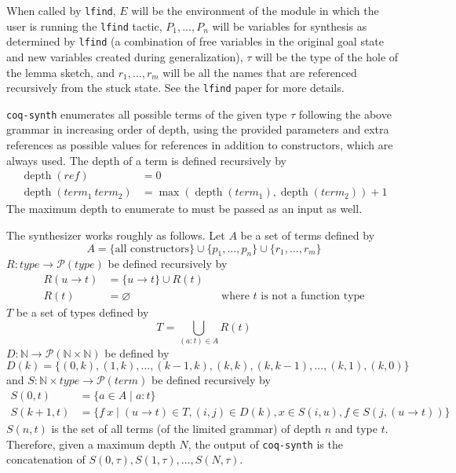 \documentclass[11pt]{article}
\newcommand{\N}{\mathbb{N}}
\DeclareMathOperator{\depth}{depth}
\begin{document}
When called by \texttt{lfind}, $E$ will be the environment of the module in which the user is running the \texttt{lfind} tactic, $P_1, \dots, P_n$ will be variables for synthesis as determined by \texttt{lfind} (a combination of free variables in the original goal state and new variables created during generalization), $\tau$ will be the type of the hole of the lemma sketch, and $r_1, \dots, r_m$ will be all the names that are referenced recursively from the stuck state. See the \texttt{lfind} paper for more details.

\texttt{coq-synth} enumerates all possible terms of the given type $\tau$ following the above grammar in increasing order of depth, using the provided parameters and extra references as possible values for references in addition to constructors, which are always used. The depth of a term is defined recursively by
\begin{align*}
    \depth(\mathit{ref}) &= 0 \\
    \depth(\mathit{term}_1\ \mathit{term}_2) &= \max(\depth(\mathit{term}_1), \depth(\mathit{term}_2)) + 1
\end{align*}
The maximum depth to enumerate to must be passed as an input as well.

The synthesizer works roughly as follows. Let $A$ be a set of terms defined by
\[A = \{\text{all constructors}\} \cup \{p_1, \dots, p_n\} \cup \{r_1, \dots, r_m\}\]
$R : \mathit{type} \to \mathcal{P}(\mathit{type})$ be defined recursively by
\begin{align*}
    R(u \to t) &= \{u \to t\} \cup R(t) \\
    R(t) &= \varnothing &&\text{where $t$ is not a function type}
\end{align*}
$T$ be a set of types defined by
\[T = \bigcup_{(a:t) \in A} R(t)\]
$D : \N \to \mathcal{P}(\N \times \N)$ be defined by
\[D(k) = \{(0, k), (1, k), \dots, (k - 1, k), (k, k), (k, k - 1), \dots, (k, 1), (k, 0)\}\]
and $S : \N \times \mathit{type} \to \mathcal{P}(\mathit{term})$ be defined recursively by
\begin{align*}
    S(0, t) &= \{a \in A \mid a : t\} \\
    S(k+1, t) &= \{f\ x \mid (u \to t) \in T, (i, j) \in D(k), x \in S(i, u), f \in S(j, (u \to t))\}
\end{align*}
$S(n, t)$ is the set of all terms (of the limited grammar) of depth $n$ and type $t$. Therefore, given a maximum depth $N$, the output of \texttt{coq-synth} is the concatenation of $S(0, \tau), S(1, \tau), \dots, S(N, \tau)$.
\end{document}
